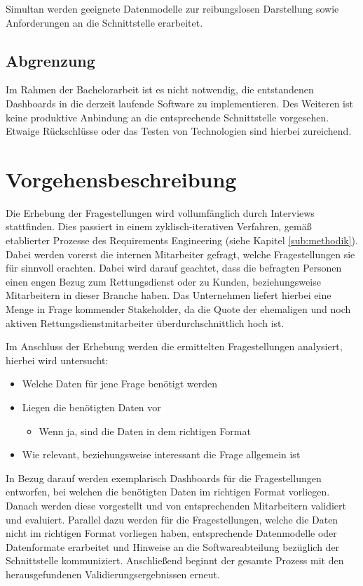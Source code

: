 Simultan werden geeignete Datenmodelle zur reibungslosen Darstellung sowie Anforderungen an die Schnittstelle erarbeitet.

\subsection{Abgrenzung}
\label{abgrenzung}
Im Rahmen der Bachelorarbeit ist es nicht notwendig, die entstandenen Dashboards in die derzeit laufende Software zu implementieren.
Des Weiteren ist keine produktive Anbindung an die entsprechende Schnittstelle vorgesehen.
Etwaige Rückschlüsse oder das Testen von Technologien sind hierbei zureichend.

\section{Vorgehensbeschreibung}
Die Erhebung der Fragestellungen wird vollumfänglich durch Interviews stattfinden.
Dies passiert in einem zyklisch-iterativen Verfahren, gemäß etablierter Prozesse des Requirements Engineering \cite{Pohl.2011} (siehe Kapitel \ref{sub:methodik}).
Dabei werden vorerst die internen Mitarbeiter gefragt, welche Fragestellungen sie für sinnvoll erachten.
Dabei wird darauf geachtet, dass die befragten Personen einen engen Bezug zum Rettungsdienst oder zu Kunden, beziehungsweise Mitarbeitern in dieser Branche haben.
Das Unternehmen liefert hierbei eine Menge in Frage kommender Stakeholder, da die Quote der ehemaligen und noch aktiven Rettungsdienstmitarbeiter überdurchschnittlich hoch ist. 


Im Anschluss der Erhebung werden die ermittelten Fragestellungen analysiert, hierbei wird untersucht:
\begin{itemize}
      \item Welche Daten für jene Frage benötigt werden
      \item Liegen die benötigten Daten vor
      \begin{itemize}
        \item Wenn ja, sind die Daten in dem richtigen Format
      \end{itemize}
      \item Wie relevant, beziehungsweise interessant die Frage allgemein ist
\end{itemize}
In Bezug darauf werden exemplarisch Dashboards für die Fragestellungen entworfen, bei welchen die benötigten Daten im richtigen Format vorliegen.
Danach werden diese vorgestellt und von entsprechenden Mitarbeitern validiert und evaluiert.
Parallel dazu werden für die Fragestellungen, welche die Daten nicht im richtigen Format vorliegen haben, entsprechende Datenmodelle oder Datenformate erarbeitet und Hinweise an die Softwareabteilung bezüglich der Schnittstelle kommuniziert.
Anschließend beginnt der gesamte Prozess mit den herausgefundenen Validierungsergebnissen erneut.


